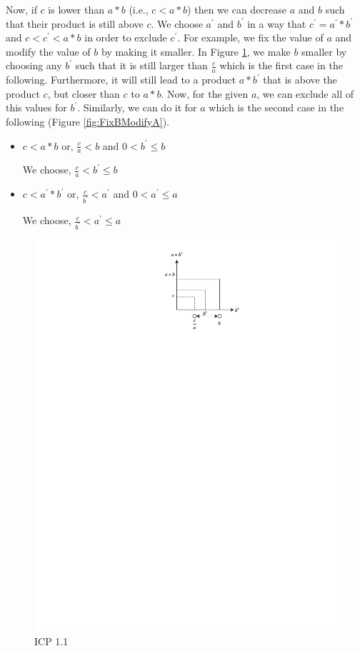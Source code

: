 \noindent Now, if $c$ is lower than $a \ast b$ (i.e., $c < a \ast b$) then we can decrease $a$ and $b$ such that their product is still above $c$.
We choose $a^\prime$ and $b^\prime$ in a way that $c^\prime = a^\prime \ast b^\prime$ and $c < c^\prime < a \ast b$ in order to exclude $c^\prime$.
For example, we fix the value of $a$ and modify the value of $b$ by making it smaller.
In Figure \ref{fig:FixAModifyB}, we make $b$ smaller by choosing any $b^\prime$ such that it is still larger than $\frac{c}{a}$ which is the first case in the following.
Furthermore, it will still lead to a product $a \ast b^\prime$ that is above the product $c$, but closer than $c$ to $a \ast b$.
Now, for the given $a$, we can exclude all of this values for $b^\prime$.
Similarly, we can do it for $a$ which is the second case in the following (Figure \ref{fig:FixBModifyA}).\newline


\begin{itemize}
    \item $c < a \ast b \text{ or, } \frac{c}{a} < b$ and $0 < b^\prime \leq b$\newline
    
    We choose, $\frac{c}{a} < b^\prime \leq b$
     \item $c < a^\prime \ast b^\prime \text{ or, } \frac{c}{b^\prime} < a^\prime$ and $0 < a^\prime \leq a$\newline
     
     We choose, $\frac{c}{b^\prime} < a^\prime \leq a$
\end{itemize}

\begin{figure}[ht!]
  \centering
  \includegraphics[width=0.6\linewidth]{./figures/ICP1_1.pdf}
  \caption{ICP 1.1}
  \label{fig:FixAModifyB}
\end{figure}

